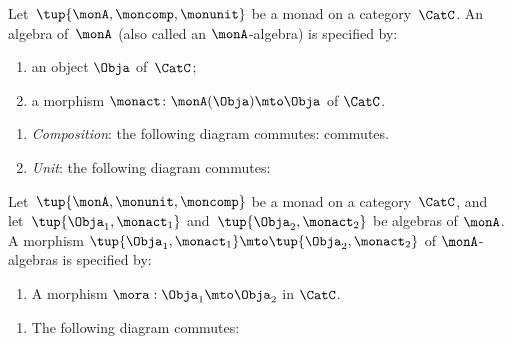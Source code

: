 \begin{ctdefinition}
    \label{def:algebramon}
    Let~$\tup{\monA, \moncomp, \monunit}$ be a monad on a category~$\CatC$.
    An algebra of~$\monA$ (also called an $\monA$-algebra) is specified by: \

    \constit
    \begin{enumerate}
        \item an object $\Obja$ of~$\CatC$;
        \item a morphism $\monact\colon \monA(\Obja) \mto \Obja$ of $\CatC$.
    \end{enumerate}
    \condit
    \begin{enumerate}
        \item \emph{Composition}: the following diagram commutes:
              commutes.
        \item \emph{Unit}: the following diagram commutes:

    \end{enumerate}
\end{ctdefinition}



\begin{ctdefinition}
    \label{def:algebramorphism}
    Let~$\tup{\monA, \monunit, \moncomp}$ be a monad on a category~$\CatC$, and let~$\tup{\Obja_1, \monact_1}$ and~$\tup{\Obja_2, \monact_2}$ be algebras of $\monA$.
    A morphism $\tup{\Obja_1, \monact_1} \mto \tup{\Obja_2, \monact_2}$ of $\monA$-algebras is specified by: \

    \constit
    \begin{enumerate}
        \item A morphism $\mora : \Obja_1 \mto \Obja_2$ in $\CatC$.
    \end{enumerate}
    \condit
    \begin{enumerate}
        \item The following diagram commutes:

    \end{enumerate}
\end{ctdefinition}

